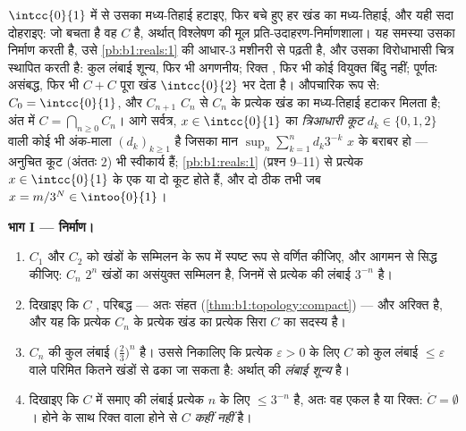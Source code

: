 \begin{problem}[{सप्ताहांत समस्या --- कैंटर का मध्य-तिहाई \omterm{def:b1:logic:sets}{समुच्चय}: लंबाई शून्य, अगणनीय, पूर्ण,
और $C + C =
\intcc{0}{2}$}]
\label{pb:b1:topology:1}
$\intcc{0}{1}$ में से उसका  मध्य-तिहाई हटाइए, फिर बचे हुए हर खंड का
मध्य-तिहाई, और यही सदा दोहराइए: जो बचता है वह \emph{} $C$ है,
अर्थात् विश्लेषण की मूल प्रति-उदाहरण-निर्माणशाला। यह समस्या उसका निर्माण
करती है, उसे \cref{pb:b1:reals:1} की आधार-$3$ मशीनरी से पढ़ती है, और उसका
विरोधाभासी चित्र स्थापित करती है: कुल लंबाई शून्य, फिर भी अगणनीय; रिक्त
, फिर भी कोई वियुक्त बिंदु नहीं; पूर्णतः असंबद्ध, फिर भी $C + C$ पूरा
खंड $\intcc{0}{2}$ भर देता है। औपचारिक रूप से: $C_0 =
\intcc{0}{1}$, और $C_{n+1}$ $C_n$ से $C_n$ के प्रत्येक खंड का 
मध्य-तिहाई हटाकर मिलता है; अंत में $C = \bigcap_{n \geq 0} C_n$। आगे
सर्वत्र, $x \in \intcc{0}{1}$ का \emph{त्रिआधारी कूट} $d_k \in \{0, 1, 2\}$
वाली कोई भी अंक-माला $(d_k)_{k\geq1}$ है जिसका मान $\sup_n \sum_{k=1}^n d_k
3^{-k}$ $x$ के बराबर हो --- अनुचित कूट (अंततः $2$) भी स्वीकार्य हैं;
\cref{pb:b1:reals:1} (प्रश्न 9--11) से प्रत्येक $x \in \intcc{0}{1}$ के एक
या दो कूट होते हैं, और दो ठीक तभी जब $x = m/3^N \in \intoo{0}{1}$।

\medskip \noindent\textbf{भाग I --- निर्माण।}
\begin{enumerate}
  \item $C_1$ और $C_2$ को खंडों के सम्मिलन के रूप में स्पष्ट रूप से वर्णित
  कीजिए, और आगमन से सिद्ध कीजिए: $C_n$ $2^n$  खंडों का असंयुक्त सम्मिलन
  है, जिनमें से प्रत्येक की लंबाई $3^{-n}$ है।
  \item दिखाइए कि $C$ , परिबद्ध --- अतः संहत
  (\cref{thm:b1:topology:compact}) --- और अरिक्त है, और यह कि प्रत्येक $C_n$
  के प्रत्येक खंड का प्रत्येक सिरा $C$ का सदस्य है।
  \item $C_n$ की कुल लंबाई $\bigl(\frac23\bigr)^n$ है। उससे निकालिए कि
  प्रत्येक $\varepsilon > 0$ के लिए  $C$ को कुल लंबाई $\leq
  \varepsilon$ वाले परिमित कितने खंडों से ढका जा सकता है: अर्थात्  की \emph{लंबाई शून्य} है।
  \item दिखाइए कि $C$ में समाए  की लंबाई प्रत्येक $n$ के लिए $\leq
  3^{-n}$ है, अतः वह एकल  है या रिक्त: $\mathring C = \emptyset$।
   होने के साथ रिक्त  वाला होने से $C$ \emph{कहीं  नहीं} है।
\end{enumerate}


\end{problem}
